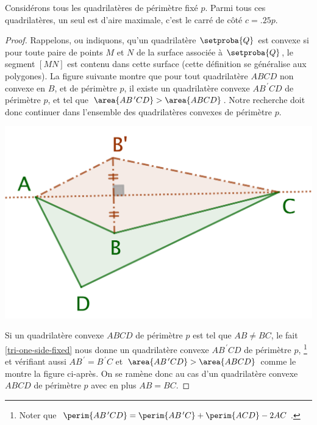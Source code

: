 \begin{fact} \label{quadri}
	Considérons tous les quadrilatères de périmètre fixé $p$. Parmi tous ces quadrilatères, un seul est d'aire maximale, c'est le carré de côté $c = \num{.25} p$.
\end{fact}


\begin{proof}
	Rappelons, ou indiquons, qu'un quadrilatère $\setproba{Q}$ est convexe si pour toute paire de points $M$ et $N$ de la surface associée à $\setproba{Q}$, le segment $[MN]$ est contenu dans cette surface (cette définition se généralise aux polygones).
	La figure suivante montre que pour tout quadrilatère $ABCD$ non convexe en $B$, et de périmètre $p$, il existe un quadrilatère convexe $AB^{\,\prime}CD$ de périmètre $p$, et tel que $\area{AB^{\,\prime}CD} > \area{ABCD}$.
	Notre recherche doit donc continuer dans l'ensemble des quadrilatères convexes de périmètre $p$.

	\begin{center}
		\includegraphics[scale=.4]{content/quadrilateral/non-convex.png}
	\end{center}
	
	
	Si un quadrilatère convexe $ABCD$ de périmètre $p$ est tel que $AB \neq BC$, le fait \ref{tri-one-side-fixed} nous donne un quadrilatère convexe $AB^{\,\prime}CD$ de périmètre $p$,%
	\footnote{
		Noter que
		$\perim{AB^{\,\prime}CD} = \perim{AB^{\,\prime}C} + \perim{ACD} - 2 AC$.
	}
	et vérifiant aussi $AB^{\,\prime} = B^{\,\prime}C$ et $\area{AB^{\,\prime}CD} > \area{ABCD}$ comme le montre la figure ci-après.
	On se ramène donc au cas d'un quadrilatère convexe $ABCD$ de périmètre $p$ avec en plus $AB = BC$.


\end{proof}
